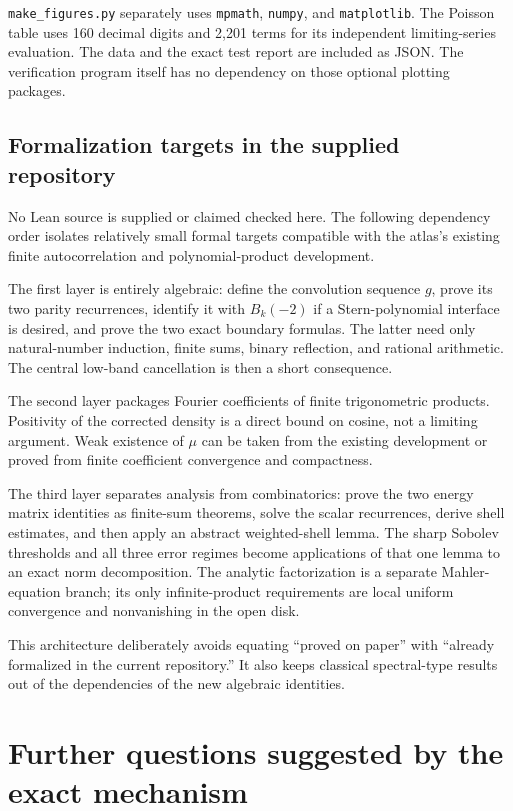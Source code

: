 \documentclass[11pt,a4paper]{article}
\numberwithin{equation}{section}
\theoremstyle{definition}
\theoremstyle{remark}
\begin{document}
\texttt{make\_figures.py} separately uses \texttt{mpmath}, \texttt{numpy}, and
\texttt{matplotlib}. The Poisson table uses 160 decimal digits and 2,201 terms
for its independent limiting-series evaluation. The data and the exact test
report are included as JSON. The verification program itself has no dependency
on those optional plotting packages.

\subsection{Formalization targets in the supplied repository}
No Lean source is supplied or claimed checked here. The following dependency
order isolates relatively small formal targets compatible with the atlas's
existing finite autocorrelation and polynomial-product development.

The first layer is entirely algebraic: define the convolution sequence $g$, prove
its two parity recurrences, identify it with $B_k(-2)$ if a Stern-polynomial
interface is desired, and prove the two exact boundary formulas. The latter
need only natural-number induction, finite sums, binary reflection, and rational
arithmetic. The central low-band cancellation is then a short consequence.

The second layer packages Fourier coefficients of finite trigonometric products.
Positivity of the corrected density is a direct bound on cosine, not a limiting
argument. Weak existence of $\mu$ can be taken from the existing development or
proved from finite coefficient convergence and compactness.

The third layer separates analysis from combinatorics: prove the two energy
matrix identities as finite-sum theorems, solve the scalar recurrences, derive
shell estimates, and then apply an abstract weighted-shell lemma. The sharp
Sobolev thresholds and all three error regimes become applications of that one
lemma to an exact norm decomposition. The analytic factorization is a separate
Mahler-equation branch; its only infinite-product requirements are local uniform
convergence and nonvanishing in the open disk.

This architecture deliberately avoids equating ``proved on paper'' with
``already formalized in the current repository.'' It also keeps classical
spectral-type results out of the dependencies of the new algebraic identities.

\section{Further questions suggested by the exact mechanism}
\label{sec:questions}
\end{document}
